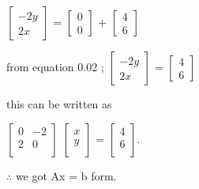 \documentclass[journal,12pt,twocolumn]{IEEEtran}
\theoremstyle{remark}
\numberwithin{equation}{subsection}
\begin{document}
      \vspace{1cm}
      $\begin{bmatrix}
        -2y \\
         2x
      \end{bmatrix}$
    =
       $\begin{bmatrix}
        0 \\
        0
      \end{bmatrix}$ 
      $+$  $\begin{bmatrix}
         4 \\
         6
      \end{bmatrix}$
      
       \vspace{1cm}
       from equation 0.02 ;
     $\begin{bmatrix}
         -2y \\
         2x
      \end{bmatrix}$
      =  $\begin{bmatrix}
        4 \\
         6
      \end{bmatrix}$ 
      
      \large 
      \vspace{1cm}
      this can be written as 
      
      \vspace{1cm}
    $\begin{bmatrix}
        0 & -2 \\
        2 & 0 \\
      \end{bmatrix}$
      $\begin{bmatrix}
        x \\
        y \\
      \end{bmatrix}$
       = $\begin{bmatrix}
         4 \\
         6 \\
      \end{bmatrix}$.
     
       \vspace{1cm}
     $\therefore$ we got Ax = b form.      
\end{document}
